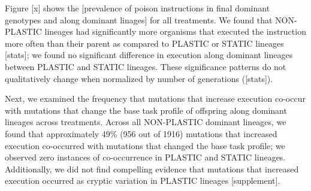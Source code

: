 Figure [x] shows the [prevalence of poison instructions in final dominant genotypes and along dominant linages] for all treatments.
We found that NON-PLASTIC lineages had significantly more organisms that executed the  instruction more often than their parent as compared to PLASTIC or STATIC lineages [stats]; we found no significant difference in  execution along dominant lineages between PLASTIC and STATIC lineages.
These significance patterns do not qualitatively change when normalized by number of generations ([stats]).

Next, we examined the frequency that mutations that increase  execution co-occur with mutations that change the base task profile of offspring along dominant lineages across treatments.
Across all NON-PLASTIC dominant lineages, we found that approximately 49\% (956 out of 1916) mutations that increased  execution co-occurred with mutations that changed the base task profile; we observed zero instances of co-occurrence in PLASTIC and STATIC lineages.
Additionally, we did not find compelling evidence that mutations that increased  execution occurred as cryptic variation in PLASTIC lineages [supplement].



